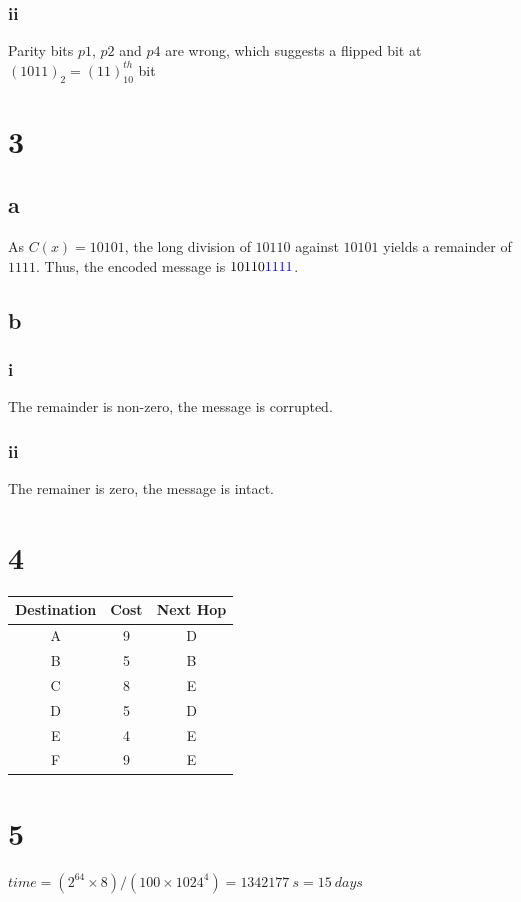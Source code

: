 \documentclass{report}
\begin{document}
      \subsubsection*{ii}
        Parity bits $p1$, $p2$ and $p4$ are wrong, which suggests a flipped bit at
        $(1011)_2 = (11)_{10}^{th}$ bit 
  
  \section*{3}
    \subsection*{a}
      As $C(x) = 10101$, the long division of $10110$ against $10101$ yields
      a remainder of $1111$. Thus, the encoded message is $10110{\color{blue}1111}$.
    \subsection*{b}
      \subsubsection*{i}
        The remainder is non-zero, the message is corrupted.
      \subsubsection*{ii}
        The remainer is zero, the message is intact.

  \section*{4}
    \begin{center}
      \begin{tabular}{|c|c|c|}
        \hline
        Destination&Cost&Next Hop \\
        \hline
        A&9&D \\
        \hline
        B&5&B \\
        \hline
        C&8&E \\
        \hline
        D&5&D \\
        \hline
        E&4&E \\
        \hline
        F&9&E \\
        \hline
      \end{tabular}
    \end{center}

  \section*{5}
    $time = (2^{64} \times 8)/(100 \times 1024^{4}) = 1342177\ s = 15\ days$
\end{document}
